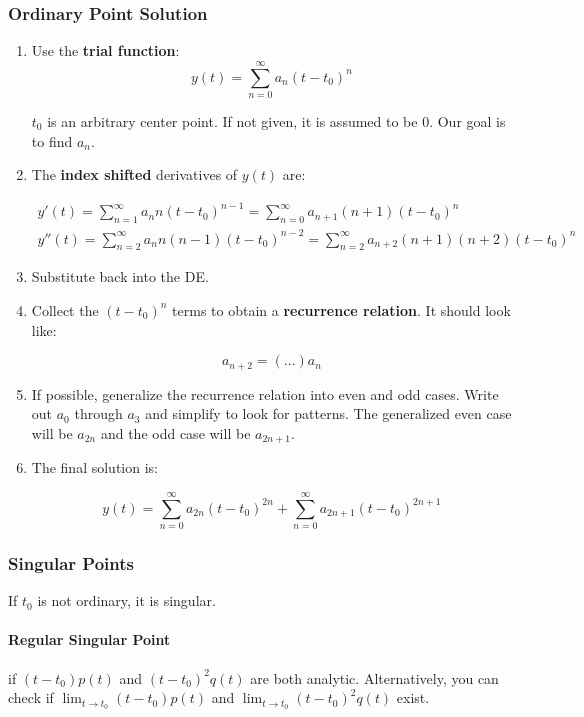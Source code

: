 \documentclass[11pt]{article}
\begin{document}
\subsubsection*{Ordinary Point Solution}
\begin{enumerate}

\item Use the \textbf{trial function}:
$$
y(t)= \sum \limits_{n=0}^{\infty} a_n(t-t_0)^n
$$

$t_0$ is an arbitrary center point. If not given, it is assumed to be 0. Our goal is to find $a_n$.

\item The \textbf{index shifted} derivatives of $y(t)$ are:

\begin{gather*}
y'(t)= \sum \limits_{n=1}^{\infty} a_n n (t-t_0)^{n-1} = \sum \limits_{n=0}^{\infty} a_{n+1} (n+1) (t-t_0)^n \\
y''(t)= \sum \limits_{n=2}^{\infty} a_n n (n-1)(t-t_0)^{n-2} = \sum \limits_{n=2}^{\infty} a_{n+2} (n+1) (n+2) (t-t_0)^n
\end{gather*}

\item Substitute back into the DE.
\item Collect the $(t-t_0)^n$ terms to obtain a \textbf{recurrence relation}. It should look like:

$$
a_{n+2} = (...)a_n
$$

\item If possible, generalize the recurrence relation into even and odd cases. Write out $a_0$ through $a_3$ and simplify to look for patterns. The generalized even case will be $a_{2n}$ and the odd case will be $a_{2n+1}$.

\item The final solution is:

$$
y(t) = \sum \limits_{n=0}^{\infty} a_{2n} (t-t_0)^{2n} + \sum \limits_{n=0}^{\infty} a_{2n+1} (t-t_0)^{2n+1}
$$

\end{enumerate}

\subsubsection*{Singular Points}
If $t_0$ is not ordinary, it is singular.
 \paragraph{Regular Singular Point} if $(t-t_0)p(t)$ and $(t-t_0)^2 q(t)$ are both analytic. Alternatively, you can check if $\displaystyle{ \lim_{t\to t_0} (t-t_0)p(t) }$ and $\displaystyle{ \lim_{t\to t_0} (t-t_0)^2 q(t) }$ exist.
\end{document}
